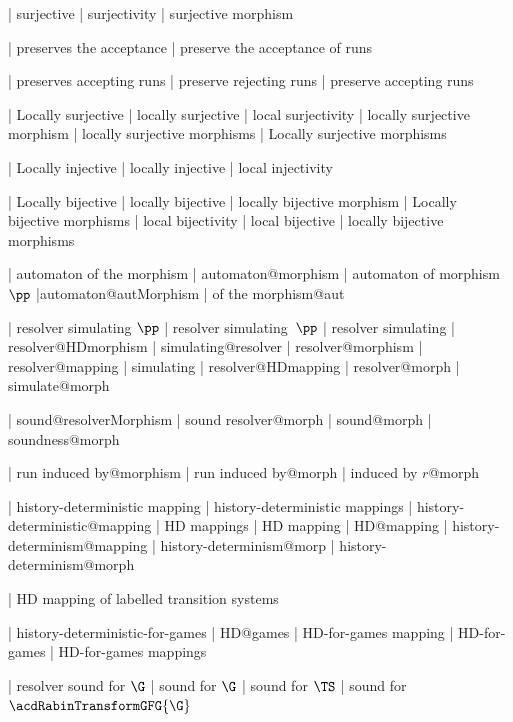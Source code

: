   | surjective
  | surjectivity
  | surjective morphism

  | preserves the acceptance
  | preserve the acceptance of runs

  | preserves accepting runs
  | preserve rejecting runs
  | preserve accepting runs
  

  | Locally surjective
  | locally surjective
  | local surjectivity
  | locally surjective morphism
  | locally surjective morphisms
  | Locally surjective morphisms


  | Locally injective
  | locally injective
  | local injectivity

  | Locally bijective
  | locally bijective
  | locally bijective morphism
  | Locally bijective morphisms
  | local bijectivity
  | local bijective
  | locally bijective morphisms

| automaton of the morphism
 | automaton@morphism
 | automaton of morphism $\pp $
 |automaton@autMorphism
 | of the morphism@aut
  




  | resolver simulating $\pp $
  | resolver simulating~$\pp $
  | resolver simulating
  | resolver@HDmorphism
  | simulating@resolver
  | resolver@morphism
  | resolver@mapping
  | simulating
  | resolver@HDmapping
  | resolver@morph
  | simulate@morph
  
  | sound@resolverMorphism
  | sound resolver@morph
  | sound@morph
  | soundness@morph

| run induced by@morphism 
| run induced by@morph
| induced by $r$@morph


  | history-deterministic mapping
  | history-deterministic mappings
  | history-deterministic@mapping
  | HD mappings
  | HD mapping
  | HD@mapping
  | history-determinism@mapping
  | history-determinism@morp
  | history-determinism@morph
 

  | HD mapping of labelled transition systems

| history-deterministic-for-games
  | HD@games
  | HD-for-games mapping
  | HD-for-games
  | HD-for-games mappings
  
  | resolver sound for $\G $
  | sound for $\G $
  | sound for $\TS $
  | sound for $\acdRabinTransformGFG {\G }$

